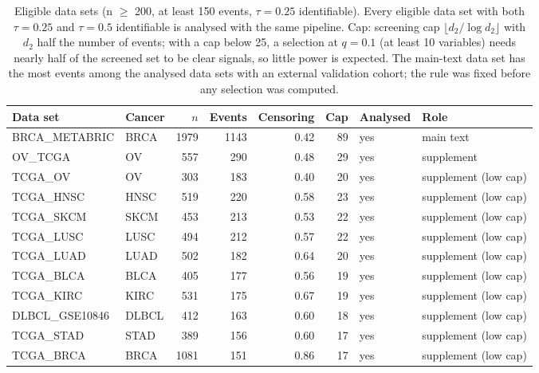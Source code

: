 \begin{table}[!htbp]
\centering\scriptsize
\caption{Eligible data sets (n $\geq$ 200, at least 150 events, $\tau=0.25$ identifiable). Every eligible data set with both $\tau=0.25$ and $\tau=0.5$ identifiable is analysed with the same pipeline. Cap: screening cap $\lfloor d_2/\log d_2\rfloor$ with $d_2$ half the number of events; with a cap below 25, a selection at $q=0.1$ (at least 10 variables) needs nearly half of the screened set to be clear signals, so little power is expected. The main-text data set has the most events among the analysed data sets with an external validation cohort; the rule was fixed before any selection was computed.}
\label{tab:realdata-eligibility}
\begin{tabular}{llrrrrll}
\toprule
Data set & Cancer & $n$ & Events & Censoring & Cap & Analysed & Role \\
\midrule
BRCA\_METABRIC & BRCA & 1979 & 1143 & 0.42 & 89 & yes & main text \\
OV\_TCGA & OV & 557 & 290 & 0.48 & 29 & yes & supplement \\
TCGA\_OV & OV & 303 & 183 & 0.40 & 20 & yes & supplement (low cap) \\
TCGA\_HNSC & HNSC & 519 & 220 & 0.58 & 23 & yes & supplement (low cap) \\
TCGA\_SKCM & SKCM & 453 & 213 & 0.53 & 22 & yes & supplement (low cap) \\
TCGA\_LUSC & LUSC & 494 & 212 & 0.57 & 22 & yes & supplement (low cap) \\
TCGA\_LUAD & LUAD & 502 & 182 & 0.64 & 20 & yes & supplement (low cap) \\
TCGA\_BLCA & BLCA & 405 & 177 & 0.56 & 19 & yes & supplement (low cap) \\
TCGA\_KIRC & KIRC & 531 & 175 & 0.67 & 19 & yes & supplement (low cap) \\
DLBCL\_GSE10846 & DLBCL & 412 & 163 & 0.60 & 18 & yes & supplement (low cap) \\
TCGA\_STAD & STAD & 389 & 156 & 0.60 & 17 & yes & supplement (low cap) \\
TCGA\_BRCA & BRCA & 1081 & 151 & 0.86 & 17 & yes & supplement (low cap) \\
\bottomrule
\end{tabular}
\end{table}
